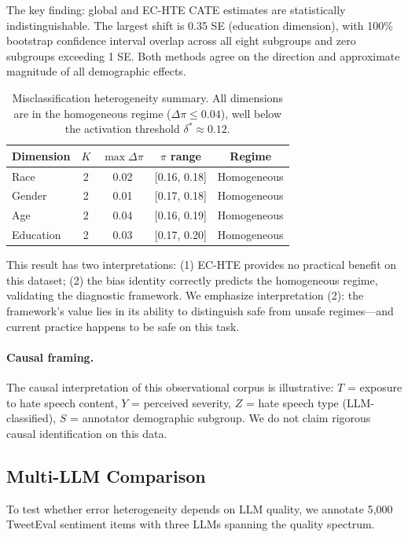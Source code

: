 \documentclass[11pt,a4paper]{article}
\begin{document}
The key finding: global and EC-HTE CATE estimates are statistically indistinguishable.
The largest shift is 0.35 SE (education dimension), with 100\% bootstrap confidence interval overlap across all eight subgroups and zero subgroups exceeding 1 SE.
Both methods agree on the direction and approximate magnitude of all demographic effects.

\begin{table}[t]
\centering
\small
\begin{tabular}{@{}lcccc@{}}
\toprule
\textbf{Dimension} & $K$ & $\max\Delta\pi$ & $\pi$ range & \textbf{Regime} \\
\midrule
Race & 2 & 0.02 & [0.16, 0.18] & Homogeneous \\
Gender & 2 & 0.01 & [0.17, 0.18] & Homogeneous \\
Age & 2 & 0.04 & [0.16, 0.19] & Homogeneous \\
Education & 2 & 0.03 & [0.17, 0.20] & Homogeneous \\
\bottomrule
\end{tabular}
\caption{Misclassification heterogeneity summary. All dimensions are in the homogeneous regime ($\Delta\pi \leq 0.04$), well below the activation threshold $\delta^* \approx 0.12$.}
\label{tab:heterogeneity}
\end{table}

This result has two interpretations:
(1) EC-HTE provides no practical benefit on this dataset;
(2) the bias identity correctly predicts the homogeneous regime, validating the diagnostic framework.
We emphasize interpretation (2): the framework's value lies in its ability to distinguish safe from unsafe regimes---and current practice happens to be safe on this task.

\paragraph{Causal framing.}
The causal interpretation of this observational corpus is illustrative: $T$ = exposure to hate speech content, $Y$ = perceived severity, $Z$ = hate speech type (LLM-classified), $S$ = annotator demographic subgroup.
We do not claim rigorous causal identification on this data.

\subsection{Multi-LLM Comparison}
\label{sec:multi_llm}

To test whether error heterogeneity depends on LLM quality, we annotate 5{,}000 TweetEval sentiment items with three LLMs spanning the quality spectrum.
\end{document}
